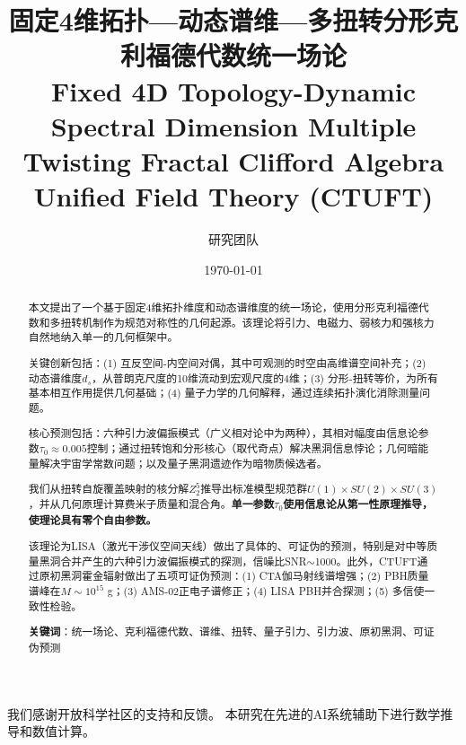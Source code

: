 \documentclass[12pt,a4paper]{revtex4-2}
\title{%
固定4维拓扑—动态谱维—多扭转分形克利福德代数统一场论\\[0.5em]
\small Fixed 4D Topology-Dynamic Spectral Dimension Multiple Twisting Fractal Clifford Algebra Unified Field Theory (CTUFT)%
}
\author{研究团队}
\affiliation{理论物理高级研究所}
\date{\today}
\theoremstyle{definition}
\newtheorem{abstract}{摘要}[section]
\theoremstyle{remark}
\begin{document}
\maketitle

\begin{abstract}
本文提出了一个基于固定4维拓扑维度和动态谱维度的统一场论，使用分形克利福德代数和多扭转机制作为规范对称性的几何起源。该理论将引力、电磁力、弱核力和强核力自然地纳入单一的几何框架中。

关键创新包括：(1) 互反空间-内空间对偶，其中可观测的时空由高维谱空间补充；(2) 动态谱维度$d_s$，从普朗克尺度的10维流动到宏观尺度的4维；(3) 分形-扭转等价，为所有基本相互作用提供几何基础；(4) 量子力学的几何解释，通过连续拓扑演化消除测量问题。

核心预测包括：六种引力波偏振模式（广义相对论中为两种），其相对幅度由信息论参数$\tau_0 \approx 0.005$控制；通过扭转饱和分形核心（取代奇点）解决黑洞信息悖论；几何暗能量解决宇宙学常数问题；以及量子黑洞遗迹作为暗物质候选者。

我们从扭转自旋覆盖映射的核分解$Z_2^5$推导出标准模型规范群$U(1) \times SU(2) \times SU(3)$，并从几何原理计算费米子质量和混合角。\textbf{单一参数$\tau_0$使用信息论从第一性原理推导，使理论具有零个自由参数。}

该理论为LISA（激光干涉仪空间天线）做出了具体的、可证伪的预测，特别是对中等质量黑洞合并产生的六种引力波偏振模式的探测，信噪比SNR$\sim$1000。此外，CTUFT通过原初黑洞霍金辐射做出了五项可证伪预测：(1) CTA伽马射线谱增强；(2) PBH质量谱峰在$M \sim 10^{15}$ g；(3) AMS-02正电子谱修正；(4) LISA PBH并合探测；(5) 多信使一致性检验。

\textbf{关键词}：统一场论、克利福德代数、谱维、扭转、量子引力、引力波、原初黑洞、可证伪预测
\end{abstract}

\tableofcontents
\newpage






































\begin{acknowledgments}
我们感谢开放科学社区的支持和反馈。
本研究在先进的AI系统辅助下进行数学推导和数值计算。
\end{acknowledgments}


\end{document}
